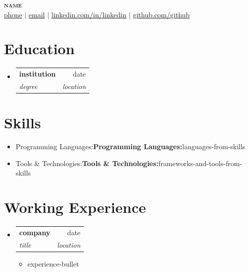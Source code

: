 \documentclass[letterpaper,11pt]{article}
\makeatletter
\newcommand{\resumeItem}[2]{
\item\small{
{\ifx\relax#1\relax\else\textbf{#1}\hspace{0.5mm}\fi#2 \vspace{-1pt}}
}
}
\newcommand{\resumeSubheading}[4]{
\vspace{-2pt}\item
\begin{tabular*}{0.97\textwidth}[t]{l@{\extracolsep{\fill}}r}
\textbf{#1} & #2 \\
\textit{\small#3} & \textit{\small #4} \\
\end{tabular*}\vspace{-7pt}
}
\newcommand{\resumeSubItem}[2]{\resumeItem{#1}{#2}\vspace{-4pt}}
\newcommand{\resumeSubHeadingListStart}{\begin{itemize}[leftmargin=0.15in, label={}]}
\newcommand{\resumeSubHeadingListEnd}{\end{itemize}}
\newcommand{\resumeItemListStart}{\begin{itemize}}
\newcommand{\resumeItemListEnd}{\end{itemize}\vspace{-5pt}}
\newcommand{\resumeHeadingSkillStart}{\begin{itemize}[leftmargin=0.15in, label={}]}
\newcommand{\resumeHeadingSkillEnd}{\end{itemize}\vspace{-5pt}}
\makeatother
\begin{document}
\begin{center}
\textbf{\Huge \scshape {name}} \\ \vspace{1pt}
\small
\href{sms:{phone}}{{phone}} $|$
\href{mailto:{email}}{{email}} $|$
\href{https://www.linkedin.com/in/{linkedin}}{\underline{linkedin.com/in/{linkedin}}} $|$
\href{https://github.com/{github}}{\underline{github.com/{github}}}
\end{center}

\section{\textbf{Education}}
\vspace{-0.4mm}
\resumeSubHeadingListStart
  \resumeSubheading
    {institution}
    {date}
    {degree}
    {location}
\resumeSubHeadingListEnd

\vspace{-4mm}
\section{\textbf{Skills}}
\resumeHeadingSkillStart
\resumeSubItem{Programming Languages:}
  {languages-from-skills}
\vspace{-1mm}
\resumeSubItem{Tools \& Technologies:}
  {frameworks-and-tools-from-skills}
\resumeHeadingSkillEnd

\vspace{-4mm}
\section{\textbf{Working Experience}}
\resumeSubHeadingListStart
  \resumeSubheading
    {company}
    {date}
    {title}
    {location}
    \resumeItemListStart
      \resumeItem{}{experience-bullet}
    \resumeItemListEnd
\resumeSubHeadingListEnd
\end{document}
